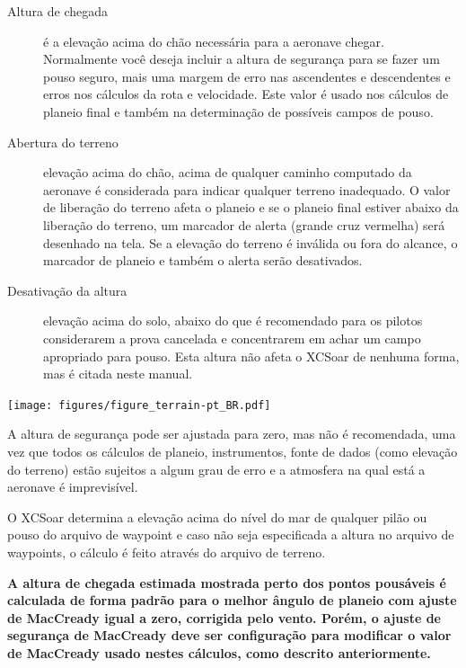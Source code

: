 \begin{description}
\item[Altura de chegada] é a elevação acima do chão necessária para a aeronave chegar.  Normalmente você deseja incluir a altura de segurança para se fazer um pouso seguro, mais uma margem de erro nas ascendentes e descendentes e erros nos cálculos da rota e velocidade.  Este valor é usado nos cálculos de planeio final e também na determinação de possíveis campos de pouso.  
\item[Abertura do terreno] elevação acima do chão, acima de qualquer caminho computado da aeronave é considerada para indicar qualquer terreno inadequado.  O valor de liberação do terreno afeta o planeio e se o planeio final estiver abaixo da liberação do terreno, um marcador de alerta (grande cruz vermelha) será desenhado na tela.  Se a elevação do terreno é inválida ou fora do alcance, o marcador de planeio e também o alerta serão desativados.
\item[Desativação da altura] elevação acima do solo, abaixo do que é recomendado para os pilotos considerarem a prova cancelada e concentrarem em achar um campo apropriado para pouso.  Esta altura não afeta o XCSoar de nenhuma forma, mas é citada neste manual.
\end{description}

\begin{maxipage}
\begin{center}
\texttt{[image: figures/figure\_terrain-pt\_BR.pdf]}
\end{center}
\end{maxipage}

\warning
A altura de segurança pode ser ajustada para zero, mas não é recomendada, uma vez que todos os cálculos de planeio, instrumentos, fonte de dados (como elevação do terreno) estão sujeitos a algum grau de erro e a atmosfera na qual está a aeronave é imprevisível.

 O XCSoar determina a elevação acima do nível do mar de qualquer pilão ou pouso do arquivo de waypoint e caso não seja especificada a altura no arquivo de waypoints, o cálculo é feito através do arquivo de terreno.

\textbf{A altura de chegada estimada mostrada perto dos pontos pousáveis é calculada de forma padrão para o melhor ângulo de planeio com ajuste de MacCready igual a zero, corrigida pelo vento.  Porém, o ajuste de segurança de MacCready deve ser configuração para modificar o valor de MacCready usado nestes cálculos, como descrito anteriormente.}

